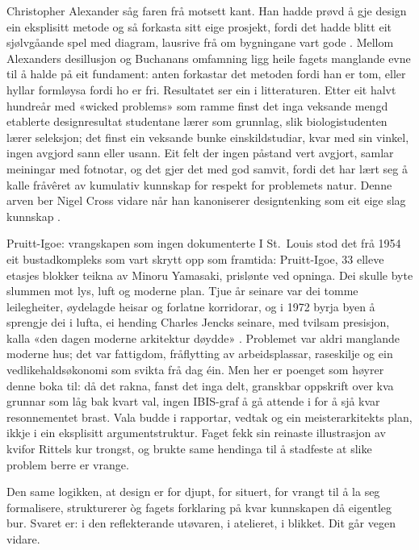 Christopher Alexander såg faren frå motsett kant. Han hadde prøvd å gje design ein eksplisitt metode og så forkasta sitt eige prosjekt, fordi det hadde blitt eit sjølvgåande spel med diagram, lausrive frå om bygningane vart gode \autocite{alexander1971state}. Mellom Alexanders desillusjon og Buchanans omfamning ligg heile fagets manglande evne til å halde på eit fundament: anten forkastar det metoden fordi han er tom, eller hyllar formløysa fordi ho er fri. Resultatet ser ein i litteraturen. Etter eit halvt hundreår med «wicked problems» som ramme finst det inga veksande mengd etablerte designresultat studentane lærer som grunnlag, slik biologistudenten lærer seleksjon; det finst ein veksande bunke einskildstudiar, kvar med sin vinkel, ingen avgjord sann eller usann. Eit felt der ingen påstand vert avgjort, samlar meiningar med fotnotar, og det gjer det med god samvit, fordi det har lært seg å kalle fråvêret av kumulativ kunnskap for respekt for problemets natur. Denne arven ber Nigel Cross vidare når han kanoniserer designtenking som eit eige slag kunnskap \autocite{cross2011dt}.

\begin{kasus}{Pruitt-Igoe: vrangskapen som ingen dokumenterte}
I St.\ Louis stod det frå 1954 eit bustadkompleks som vart skrytt opp som framtida: Pruitt-Igoe, 33 elleve etasjes blokker teikna av Minoru Yamasaki, prislønte ved opninga. Dei skulle byte slummen mot lys, luft og moderne plan. Tjue år seinare var dei tomme leilegheiter, øydelagde heisar og forlatne korridorar, og i 1972 byrja byen å sprengje dei i lufta, ei hending Charles Jencks seinare, med tvilsam presisjon, kalla «den dagen moderne arkitektur døydde» \autocite{jencks1977language}. Problemet var aldri manglande moderne hus; det var fattigdom, fråflytting av arbeidsplassar, raseskilje og ein vedlikehaldsøkonomi som svikta frå dag éin. Men her er poenget som høyrer denne boka til: då det rakna, fanst det inga delt, granskbar oppskrift over kva grunnar som låg bak kvart val, ingen IBIS-graf å gå attende i for å sjå kvar resonnementet brast. Vala budde i rapportar, vedtak og ein meisterarkitekts plan, ikkje i ein eksplisitt argumentstruktur. Faget fekk sin reinaste illustrasjon av kvifor Rittels kur trongst, og brukte same hendinga til å stadfeste at slike problem berre er vrange.
\end{kasus}

\vignett

Den same logikken, at design er for djupt, for situert, for vrangt til å la seg formalisere, strukturerer òg fagets forklaring på kvar kunnskapen då eigentleg bur. Svaret er: i den reflekterande utøvaren, i atelieret, i blikket. Dit går vegen vidare.

